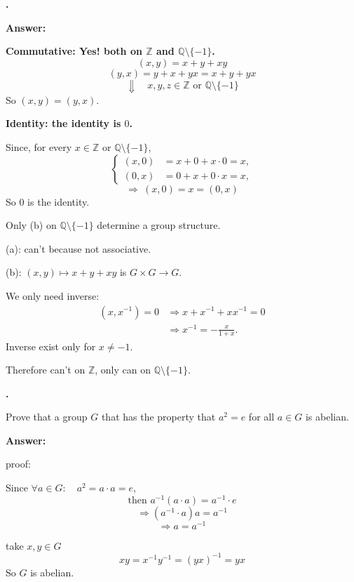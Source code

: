 \documentclass[11pt]{article}
\newcounter{ej}
\renewcommand{\theej}{\textbf{\arabic{ej}.}}
\newenvironment{ej}{
    \stepcounter{ej}
    \begin{list}{\theej}{
        \setlength{\itemindent}{0ex}
        \setlength{\labelwidth}{4ex}
        \setlength{\labelsep}{0.5ex}
        \setlength{\leftmargin}{4ex}
        \setlength{\listparindent}{0ex}
        \setlength{\topsep}{3mm plus 0.5mm minus 0.5mm}
        \setlength{\parsep}{0mm}
        \setlength{\itemsep}{1mm plus 0.3mm minus 0.3mm}
        \setlength{\rightmargin}{0ex}
    }
    \item
}{\end{list}}
\newenvironment{sol}{
    \def\FrameCommand##1{\fcolorbox{black}{gray!20}{##1}}%
    \MakeFramed{\advance\hsize-\width \FrameRestore}%
    \noindent\textbf{Answer:} \ignorespaces
}{\endMakeFramed}
\newcommand{\Z}{\mathbb{Z}}
\newcommand{\Q}{\mathbb{Q}}
\begin{document}
\begin{ej}
\begin{sol}
            \textbf{Commutative: Yes! both on $\Z$ and $\Q\setminus\{-1\}$.}
            \[
                (x,y)=x+y+xy
            \]
            \[
                (y,x)=y+x+yx=x+y+yx
            \]
            \[
                \Downarrow\quad x,y,z\in\Z\text{ or }\Q\setminus\{-1\}
            \]
            So $(x,y)=(y,x)$.

            \textbf{Identity: the identity is $0$.}

            Since, for every $x\in\Z$ or $\Q\setminus\{-1\}$,
            \[
                \left\{
                \begin{aligned}
                    (x,0)&=x+0+x\cdot0=x,\\
                    (0,x)&=0+x+0\cdot x=x,
                \end{aligned}
                \right.
            \]
            \[
                \Rightarrow\ (x,0)=x=(0,x)
            \]
            So $0$ is the identity.

            \medskip
            Only (b) on $\Q\setminus\{-1\}$ determine a group structure.

            (a): can't because not associative.

            (b): $(x,y)\mapsto x+y+xy$ is $G\times G\longrightarrow G$.

            We only need inverse:
            \begin{align*}
                (x,x^{-1})=0
                    &\Rightarrow x+x^{-1}+xx^{-1}=0\\
                    &\Rightarrow x^{-1}=-\frac{x}{1+x}.
            \end{align*}
            Inverse exist only for $x\ne-1$.

            Therefore can't on $\Z$, only can on $\Q\setminus\{-1\}$.
        \end{sol}
    \end{ej}

    \begin{ej}
        Prove that a group $G$ that has the property that $a^2=e$ for all
        $a\in G$ is abelian.

        \begin{sol}
            proof:

            Since $\forall a\in G:\quad a^2=a\cdot a=e$,
            \[
                \text{then }a^{-1}(a\cdot a)=a^{-1}\cdot e
            \]
            \[
                \Rightarrow (a^{-1}\cdot a)a=a^{-1}
            \]
            \[
                \Rightarrow a=a^{-1}
            \]

            take $x,y\in G$
            \[
                xy=x^{-1}y^{-1}=(yx)^{-1}=yx
            \]
            So $G$ is abelian.
        \end{sol}
    \end{ej}
\end{document}
